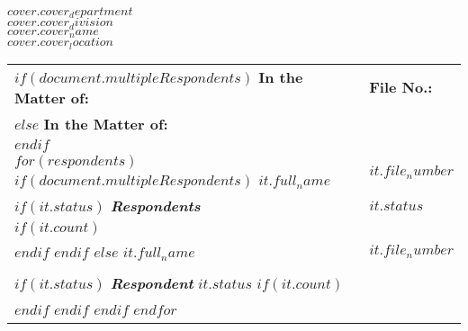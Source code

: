 \documentclass[12pt]{letter}
\begin{document}
\begin{letter}{}

\begin{center}
    \textbf{$cover.cover_department$} \\
    \textbf{$cover.cover_division$} \\
    \textbf{$cover.cover_name$} \\
    \textbf{$cover.cover_location$}
\end{center}

\renewcommand{\arraystretch}{1.2}  %

\vspace{2em}
\makebox[0.5\textwidth]{\hrulefill}
\begin{flushleft}
    \begin{tabular}{ p{} | p{} }
      $if(document.multipleRespondents)$
        \textbf{In the Matter of:} & \textbf{\hspace{1em}File No.:} \\
      $else$
        \textbf{In the Matter of:} \\
      $endif$ 
      \vspace{.0em} & \\ 
      $for(respondents)$
        $if(document.multipleRespondents)$
          \textbf{$it.full_name$} & \textbf{\hspace{1em}$it.file_number$} \\
          $if(it.status)$ 
            \textit{\textbf{Respondents}} & \textbf{$it.status$} \\
            $if(it.count)$ 
              & \\
            $endif$
          $endif$
        $else$
          \textbf{$it.full_name$} & \textbf{\hspace{1em}$it.file_number$} \\ \\
          $if(it.status)$ 
            \textit{\textbf{Respondent}} 
            \textbf{$it.status$}
            $if(it.count)$ 
              \vspace{.25em} & \\
            $endif$
          $endif$
        $endif$    
      $endfor$
    \end{tabular}
\end{flushleft}
\makebox[0.5\textwidth]{\hrulefill}
 
\vspace{1em}


\end{letter}
\end{document}
